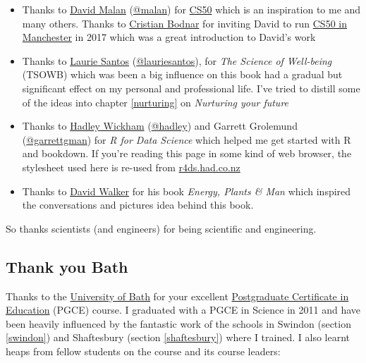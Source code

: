 \documentclass[
]{book}
\providecommand{\tightlist}{%
  \setlength{\itemsep}{0pt}\setlength{\parskip}{0pt}}
\begin{document}
\begin{itemize}
\tightlist
\item
  Thanks to \href{https://en.wikipedia.org/wiki/David_J._Malan}{David Malan} (\href{https://cs.harvard.edu/malan/}{@malan}) for \href{https://en.wikipedia.org/wiki/CS50}{CS50} which is an inspiration to me and many others. \citep{cs50, cs50zoom, CS502021} Thanks to \href{https://crisbodnar.github.io/}{Cristian Bodnar} for inviting David to run \href{http://cs50.hacksoc.com}{CS50 in Manchester} in 2017 which was a great introduction to David's work \citep{cs50mcr}
\item
  Thanks to \href{https://en.wikipedia.org/wiki/Laurie_R._Santos}{Laurie Santos} (\href{https://twitter.com/lauriesantos}{@lauriesantos}), for \emph{The Science of Well-being} (TSOWB) \citep{lauriesantos} which was been a big influence on this book had a gradual but significant effect on my personal and professional life. I've tried to distill some of the ideas into chapter \ref{nurturing} on \emph{Nurturing your future}
\item
  Thanks to \href{https://en.wikipedia.org/wiki/Hadley_Wickham}{Hadley Wickham} (\href{https://github.com/hadley}{@hadley}) and Garrett Grolemund (\href{https://github.com/garrettgman}{@garrettgman}) for \emph{R for Data Science} \citep{r4ds} which helped me get started with R and bookdown. If you're reading this page in some kind of web browser, the stylesheet used here is re-used from \href{https://r4ds.had.co.nz/}{r4ds.had.co.nz}
\item
  Thanks to \href{https://en.wikipedia.org/wiki/David_A._Walker_(scientist)}{David Walker} for his book \emph{Energy, Plants \& Man} which inspired the conversations and pictures idea behind this book. \citep{epm}
\end{itemize}

So thanks scientists (and engineers) for being scientific and engineering. 🙏

\hypertarget{bath}{%
\subsection{Thank you Bath}\label{bath}}

Thanks to the \href{https://en.wikipedia.org/wiki/University_of_Bath}{University of Bath} for your excellent \href{https://en.wikipedia.org/wiki/Postgraduate_Certificate_in_Education}{Postgraduate Certificate in Education} (PGCE) course. I graduated with a PGCE in Science in 2011 and have been heavily influenced by the fantastic work of the schools in Swindon (section \ref{swindon}) and Shaftesbury (section \ref{shaftesbury}) where I trained. I also learnt heaps from fellow students on the course and its course leaders:
\end{document}
